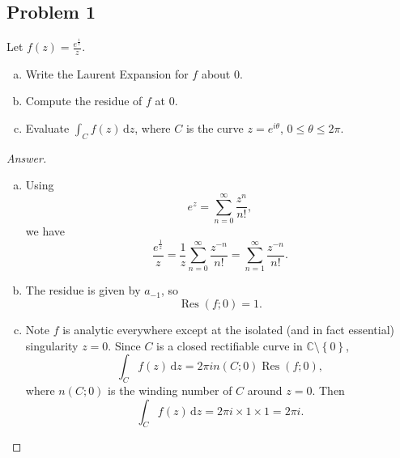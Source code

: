\documentclass[12pt]{article}
\newcommand{\cx}{\mathbb{C}}
\newcommand\setb[1]{\left \{ #1 \right \}}
\theoremstyle{definition}
\DeclareMathOperator\Res{Res}
\begin{document}
\subsection{Problem 1}
Let $\displaystyle f(z) = \frac{e^{\frac{1}{z}}}{z}$.
\begin{enumerate}[a)]
    \item Write the Laurent Expansion for $f$ about $0$.
    \item Compute the residue of $f$ at $0$.
    \item Evaluate $\displaystyle \int_C f(z) \, \mathrm{d}z$, where $C$ is the curve $z = e^{i \theta}$, $0 \leq \theta \leq 2\pi$.
\end{enumerate}
\begin{proof}[Answer]
    \noindent
    \begin{enumerate}[a)]
        \item Using 
        \[
            e^z = \sum\limits_{n = 0}^{\infty} \frac{z^n}{n!},
        \]
        we have 
        \[
            \frac{e^{\frac{1}{z}}}{z} = \frac{1}{z} \sum\limits_{n = 0}^{\infty} \frac{z^{-n}}{n!} = \sum\limits_{n = 1}^{\infty} \frac{z^{-n}}{n!}.
        \]
        \item The residue is given by $a_{-1}$, so 
        \[
            \Res(f;0) = \boxed{ 1. }
        \]
        \item Note $f$ is analytic everywhere except at the isolated (and in fact essential) singularity $z = 0$. Since $C$ is a closed rectifiable curve in $\cx \setminus \setb{ 0 }$, 
        \[
            \int_C f(z) \, \mathrm{d}z = 2\pi i n(C;0) \Res(f;0),
        \]
        where $n(C;0)$ is the winding number of $C$ around $z = 0$. Then
        \[
            \int_C f(z) \, \mathrm{d}z = 2\pi i \times 1 \times 1 = \boxed{ 2\pi i. }
        \]
    \end{enumerate}
\end{proof}
\end{document}

